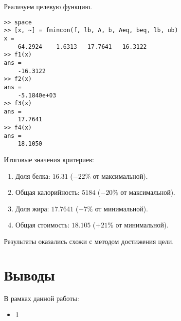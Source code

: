 Реализуем целевую функцию.




\begin{lstlisting}[caption=\code{Console}]
>> space
>> [x, ~] = fmincon(f, lb, A, b, Aeq, beq, lb, ub)
x =
	64.2924    1.6313   17.7641   16.3122
>> f1(x)
ans =
	-16.3122
>> f2(x)
ans =
	-5.1840e+03
>> f3(x)
ans =
	17.7641
>> f4(x)
ans =
	18.1050
\end{lstlisting}

Итоговые значения критериев:

\begin{enumerate}
	\item Доля белка: $16.31$ ($-22\%$ от максимальной).
	\item Общая калорийность: $5184$ ($-20\%$ от максимальной).
	\item Доля жира: $17.7641$ ($+7\%$ от минимальной).
	\item Общая стоимость: $18.105$ ($+21\%$ от минимальной).
\end{enumerate}

Результаты оказались схожи с методом достижения цели.

\section{Выводы}

В рамках данной работы:

\begin{itemize}
	\item 1
\end{itemize}


